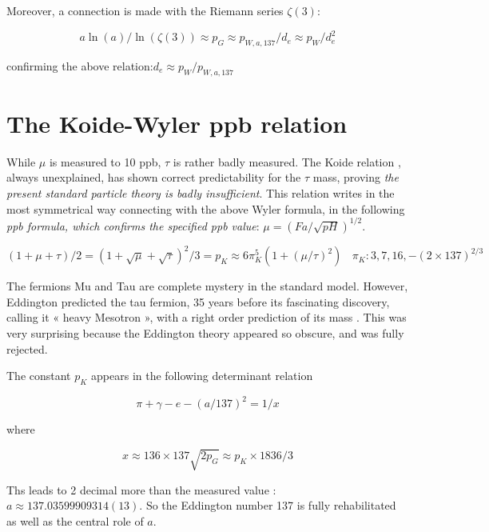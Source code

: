 \documentclass[a4paper,9pt]{article}
\begin{document}
Moreover, a connection is made with the Riemann series $\zeta(3)$:

\begin{equation}
a\ln(a)/\ln(\zeta(3)) \approx p_G \approx p_{W,a,137}/d_e \approx p_W/d_e^2
\end{equation}

confirming the above relation:$d_e \approx p_W /p_{W, a, 137}$







\section {The Koide-Wyler ppb relation}

While $\mu$ is measured to 10 ppb, $\tau$ is rather badly measured. The Koide relation \cite{Koide}, always unexplained, has shown correct predictability for the $\tau$ mass, proving \textit{the present standard particle theory is badly insufficient}. This relation writes in the most symmetrical way connecting with the above Wyler formula, in the following \textit{ppb formula, which confirms the specified ppb value}: $\mu = (Fa/\sqrt{pH})^{1/2}$\cite{Sanchez}.


\begin{equation}
(1 + \mu + \tau)/2 = (1 + \sqrt{\mu} + \sqrt{\tau})^2/3 = p_K \approx 6\pi_K^5 (1+(\mu / \tau)^2) ~~~~\pi_K: 3,7,16,-(2\times 137)^{2/3}
\end{equation}

The fermions Mu and Tau are complete mystery in the standard model. However, Eddington predicted the tau fermion, 35 years before its fascinating discovery, calling it « heavy Mesotron », with a right order prediction of its mass \cite{Eddington}.  This was very surprising because the Eddington theory appeared so obscure, and was fully rejected.

     The constant $p_K$ appears in the following determinant relation
     
 \begin{equation}
\pi+ \gamma - e - (a/137)^2 = 1/x
\end{equation}    

where 

\begin{equation}
x \approx 136 \times 137 \sqrt{2p_G} \approx p_K \times 1836/3 
\end{equation}

Ths leads to 2 decimal more than the measured value : $a \approx 137.03599909314(13)$. So the Eddington number 137 is fully rehabilitated as well as the central role of $a$.
\end{document}
